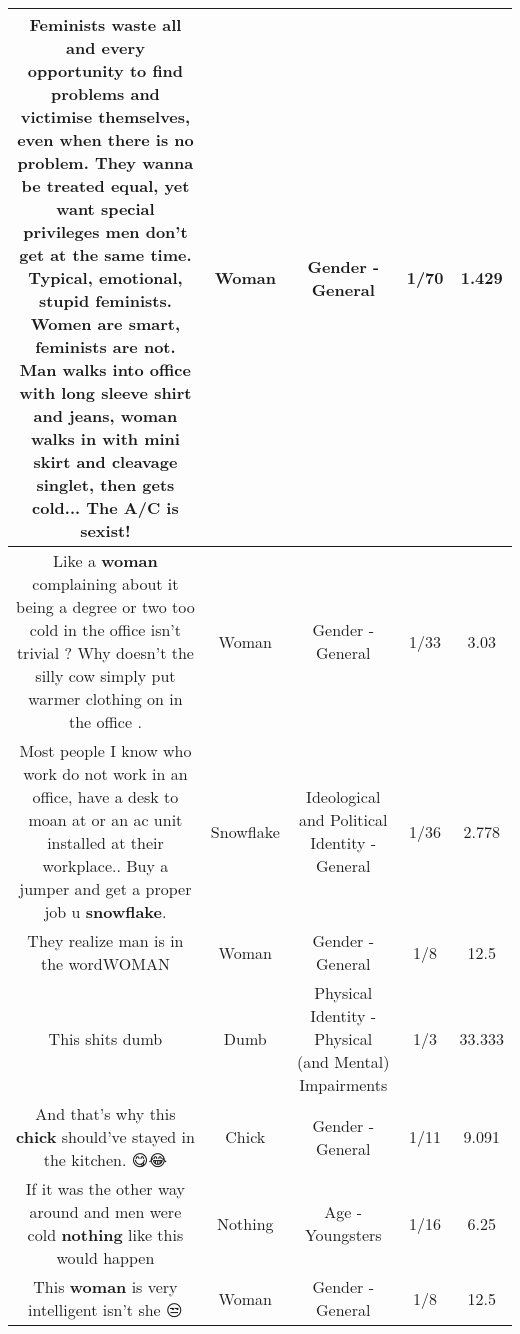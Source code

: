 \documentclass[11pt]{article}
\newlength\mylength
\begin{document}
\begin{center}
\begin{longtable}{|C{.65\mylength}|C{.30\mylength}|C{.12\mylength}|C{.12\mylength}|C{.12\mylength}|}
  \small Feminists waste all and every opportunity to find problems and victimise themselves, even when there is no problem. They wanna be treated equal, yet want special privileges men don't get at the same time. Typical, emotional, stupid feminists. Women are smart, feminists are not. Man walks into office with long sleeve shirt and jeans, \textbf{woman} walks in with mini skirt and cleavage singlet, then gets cold... The A/C is sexist!\normalsize   & Woman & Gender - General & 1/70 & 1.429 \\  \hline
  \small Like a \textbf{woman} complaining about it being a degree or two too cold in the office isn't trivial ?  Why doesn't the silly cow simply put warmer clothing on in the office .\normalsize   & Woman & Gender - General & 1/33 & 3.03 \\  \hline
  \small Most people I know who work do not work in an office, have a desk to moan at or an ac unit installed at their workplace.. Buy a jumper and get a proper job u \textbf{snowflake}.\normalsize   & Snowflake &  Ideological and Political Identity - General & 1/36 & 2.778 \\  \hline
  \small They realize man is in the wordWOMAN\normalsize   & Woman & Gender - General & 1/8 & 12.5 \\  \hline
  \small This shits dumb\normalsize   & Dumb & Physical Identity - Physical (and Mental) Impairments & 1/3 & 33.333 \\  \hline
  \small And that's why this \textbf{chick} should've stayed in the kitchen. 😋😂\normalsize   & Chick & Gender - General & 1/11 & 9.091 \\  \hline
  \small If it was the other way around and men were cold \textbf{nothing} like this would happen\normalsize   & Nothing & Age - Youngsters & 1/16 & 6.25 \\  \hline
  \small This \textbf{woman} is very intelligent isn't she 😒\normalsize   & Woman & Gender - General & 1/8 & 12.5 \\  \hline

\end{longtable}
\end{center}
\end{document}
